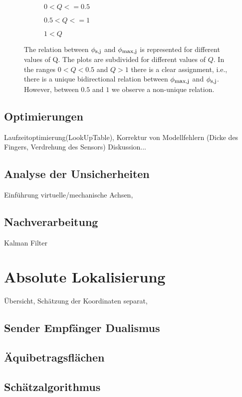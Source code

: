 \begin{figure}
	\begin{subfigure}{0.5\textwidth}
		\centering
		\caption{$0<Q<=0.5$}
		\label{fig:0_05_Unique}
	\end{subfigure}
	\hspace{0.25cm}
	\begin{subfigure}{0.5\textwidth}
		\centering
		\caption{$0.5<Q<=1$}
		\label{fig:05_10_unique}
	\end{subfigure}
	\begin{subfigure}{0.5\textwidth}
		\centering
		\caption{$1<Q$}
		\label{fig:bigger1_unique}
	\end{subfigure}
	\caption{ The relation between $\phi_{\textrm{\footnotesize{s,j}}}$ and $\phi_{\textrm{\footnotesize{max,j}}}$ is represented for different values of Q. The plots are subdivided for different values of $Q$. In the ranges $0 < Q < 0.5$ and $Q>1$ there is a clear assignment, i.e., there is a unique bidirectional relation between $\phi_{\textrm{\footnotesize{max,j}}}$ and $\phi_{\textrm{\footnotesize{s,j}}}$. However, between $0.5$ and $1$ we observe a non-unique relation.}
	\label{fig:uniqueness}
\end{figure}

	\subsection{Optimierungen}
		Laufzeitoptimierung(LookUpTable), Korrektur von Modellfehlern (Dicke des Fingers, Verdrehung des Sensors)
		Diskussion...
	\subsection{Analyse der Unsicherheiten}
		Einführung virtuelle/mechanische Achsen,

	\subsection{Nachverarbeitung}
		Kalman Filter

	\section{Absolute Lokalisierung}
		Übersicht, Schätzung der Koordinaten separat, 
		\subsection{Sender Empfänger Dualismus}

		\subsection{Äquibetragsflächen}

		\subsection{Schätzalgorithmus}
